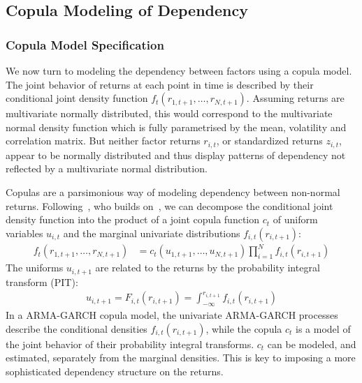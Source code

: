 
\subsection{Copula Modeling of Dependency} %
\label{sub:05_04_copula}

\subsubsection{Copula Model Specification}

We now turn to modeling the dependency between factors using a copula model. The joint behavior of returns at each point in time is described by their conditional joint density function $f_t(r_{1, t+1}, \ldots, r_{N, t+1})$. Assuming returns are multivariate normally distributed, this would correspond to the multivariate normal density function which is fully parametrised by the mean, volatility and correlation matrix. But neither factor returns $r_{i,t}$, or standardized returns $z_{i,t}$, appear to be normally distributed and thus display patterns of dependency not reflected by a multivariate normal distribution.

Copulas are a parsimonious way of modeling dependency between non-normal returns. Following~\textcite{ChristoffersenErrunzaJacobLanglois2012}, who builds on~\textcite{Patton2006,Sklar1959}, we can decompose the conditional joint density function into the product of a joint copula function $c_t$ of uniform variables $u_{i,t}$ and the marginal univariate distributions $f_{i,t}(r_{i, t+1})$:
\begin{align}
  f_t(r_{1, t+1}, \ldots, r_{N, t+1}) &=
    c_t(u_{1, t+1}, \ldots, u_{N, t+1}) \prod^N_{i = 1}
    f_{i,t}(r_{i, t + 1})
\end{align}
The uniforms $u_{i, t+1}$ are related to the returns by the probability integral transform (PIT):
\begin{align}
  u_{i, t+1} = F_{i,t}(r_{i, t+1}) =
    \int_{-\infty}^{r_{i, t + 1}} f_{i,t}(r_{i, t+1})
\end{align}
In a ARMA-GARCH copula model, the univariate ARMA-GARCH processes describe the conditional densities $f_{i,t}(r_{i, t+1})$, while the copula $c_t$ is a model of the joint behavior of their probability integral transforms. $c_t$ can be modeled, and estimated, separately from the marginal densities. This is key to imposing a more sophisticated dependency structure on the returns.

